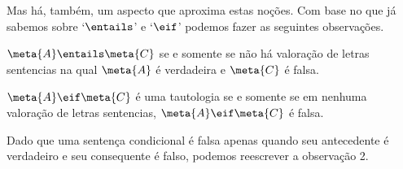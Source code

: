 Mas há, também, um aspecto que aproxima estas noções.
Com base no que já sabemos sobre `$\entails$' e `$\eif$' podemos fazer as seguintes observações.

	\begin{ebullet}
		\item[\textbf{Observação 1:}] $\meta{A} \entails \meta{C}$ se e somente se não há valoração de letras sentencias na qual $\meta{A}$ é verdadeira e $\meta{C}$ é falsa.
	\end{ebullet}

	\begin{ebullet}
		\item[\textbf{Observação 2:}] $\meta{A} \eif \meta{C}$ é uma tautologia se e somente se em nenhuma valoração de letras sentencias, $\meta{A} \eif \meta{C}$ é falsa.
	\end{ebullet}
Dado que uma sentença condicional é falsa apenas quando seu antecedente é verdadeiro e seu consequente é falso, podemos reescrever a observação 2.

